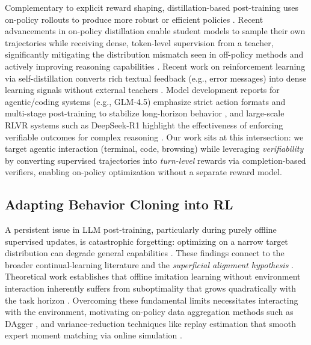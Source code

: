 Complementary to explicit reward shaping, distillation-based post-training uses on-policy rollouts to produce more robust or efficient policies \citep{lu2025onpolicydistillation}. Recent advancements in on-policy distillation enable student models to sample their own trajectories while receiving dense, token-level supervision from a teacher, significantly mitigating the distribution mismatch seen in off-policy methods and actively improving reasoning capabilities \citep{zhao2026selfdistilledreasoneronpolicyselfdistillation,xu2025learninginteractionagenticdistillation}.
Recent work on reinforcement learning via self-distillation converts rich textual feedback (e.g., error messages) into dense learning signals without external teachers \citep{hubotter2026selfdistillation}.
Model development reports for agentic/coding systems (e.g., GLM-4.5) emphasize strict action formats and multi-stage post-training to stabilize long-horizon behavior \citep{5team2025glm45agenticreasoningcoding}, and large-scale RLVR systems such as DeepSeek-R1 highlight the effectiveness of enforcing verifiable outcomes for complex reasoning \citep{Guo_2025}.
Our work sits at this intersection: we target agentic interaction (terminal, code, browsing) while leveraging \emph{verifiability} by converting supervised trajectories into \emph{turn-level} rewards via completion-based verifiers, enabling on-policy optimization without a separate reward model.


\subsection{Adapting Behavior Cloning into RL}

A persistent issue in LLM post-training, particularly during purely offline supervised updates, is catastrophic forgetting: optimizing on a narrow target distribution can degrade general capabilities \citep{luo2023empiricalCF,li2024revisitingCF,imanov2026mechanisticCF}. These findings connect to the broader continual-learning literature \citep{kirkpatrick2017ewc,li2016lwf} and the \emph{superficial alignment hypothesis} \citep{zhou2023limaalignment,vergarabrowne2026sahcomplexity,raghavendra2024revisitingSAH}.  Theoretical work establishes that offline imitation learning without environment interaction inherently suffers from suboptimality that grows quadratically with the task horizon \citep{rajaraman2020towardfundamentallimitsimitation}. Overcoming these fundamental limits necessitates interacting with the environment, motivating on-policy data aggregation methods such as DAgger \citep{ross2011dagger}, and variance-reduction techniques like replay estimation that smooth expert moment matching via online simulation \citep{swamy2022minimaxoptimalonlineimitation}.

